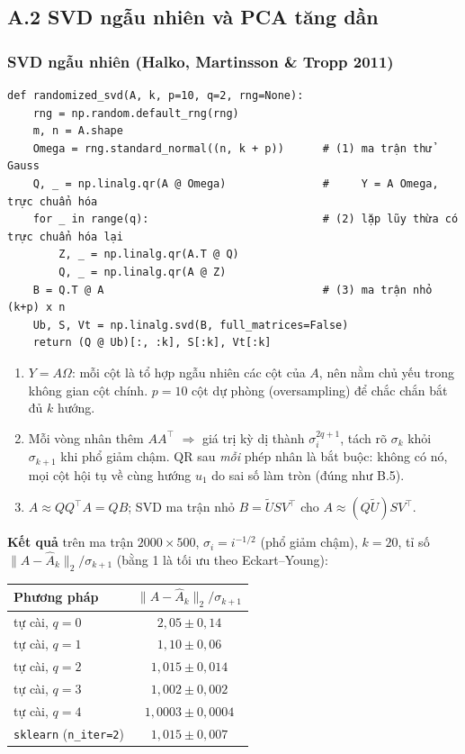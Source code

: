 \documentclass[11pt,a4paper]{article}
\newcommand{\code}[1]{\texttt{#1}}
\begin{document}
\subsection{A.2 SVD ngẫu nhiên và PCA tăng dần}
\subsubsection*{SVD ngẫu nhiên (Halko, Martinsson \& Tropp 2011)}
\begin{verbatim}
def randomized_svd(A, k, p=10, q=2, rng=None):
    rng = np.random.default_rng(rng)
    m, n = A.shape
    Omega = rng.standard_normal((n, k + p))      # (1) ma trận thử Gauss
    Q, _ = np.linalg.qr(A @ Omega)               #     Y = A Omega, trực chuẩn hóa
    for _ in range(q):                           # (2) lặp lũy thừa có trực chuẩn hóa lại
        Z, _ = np.linalg.qr(A.T @ Q)
        Q, _ = np.linalg.qr(A @ Z)
    B = Q.T @ A                                  # (3) ma trận nhỏ (k+p) x n
    Ub, S, Vt = np.linalg.svd(B, full_matrices=False)
    return (Q @ Ub)[:, :k], S[:k], Vt[:k]
\end{verbatim}
\begin{enumerate}[label=(\arabic*)]
\item $Y=A\Omega$: mỗi cột là tổ hợp ngẫu nhiên các cột của $A$, nên nằm chủ yếu trong không gian cột chính. $p=10$ cột dự phòng (oversampling) để chắc chắn bắt đủ $k$ hướng.
\item Mỗi vòng nhân thêm $AA^\top$ $\Rightarrow$ giá trị kỳ dị thành $\sigma_i^{2q+1}$, tách rõ $\sigma_k$ khỏi $\sigma_{k+1}$ khi phổ giảm chậm. QR sau \emph{mỗi} phép nhân là bắt buộc: không có nó, mọi cột hội tụ về cùng hướng $u_1$ do sai số làm tròn (đúng như B.5).
\item $A\approx QQ^\top A=QB$; SVD ma trận nhỏ $B=\tilde US V^\top$ cho $A\approx(Q\tilde U)SV^\top$.
\end{enumerate}
\textbf{Kết quả} trên ma trận $2000\times500$, $\sigma_i=i^{-1/2}$ (phổ giảm chậm), $k=20$, tỉ số $\|A-\hat A_k\|_2/\sigma_{k+1}$ (bằng 1 là tối ưu theo Eckart–Young):
\begin{center}
\begin{tabular}{lc}
\toprule
\textbf{Phương pháp} & $\|A-\hat A_k\|_2/\sigma_{k+1}$ \\
\midrule
tự cài, $q=0$ & $2{,}05\pm0{,}14$ \\
tự cài, $q=1$ & $1{,}10\pm0{,}06$ \\
tự cài, $q=2$ & $1{,}015\pm0{,}014$ \\
tự cài, $q=3$ & $1{,}002\pm0{,}002$ \\
tự cài, $q=4$ & $1{,}0003\pm0{,}0004$ \\
\code{sklearn} (\code{n\_iter=2}) & $1{,}015\pm0{,}007$ \\
\bottomrule
\end{tabular}
\end{center}
\end{document}
